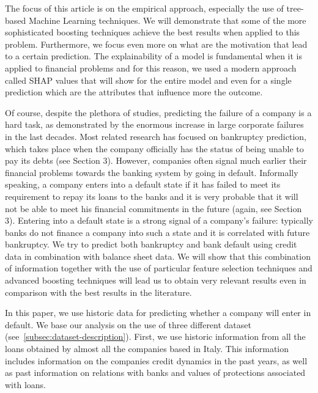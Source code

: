The focus of this article is on the empirical approach, especially the use of tree-based Machine Learning techniques. We will demonstrate that some of the more sophisticated boosting techniques achieve the best results when applied to this problem. Furthermore, we focus even more on what are the motivation that lead to a certain prediction. The explainability of a model is fundamental when it is applied to financial problems and for this reason, we used a modern approach called SHAP values that will show for the entire model and even for a single prediction which are the attributes that influence more the outcome. 

Of course, despite the plethora of studies, predicting the failure of a company is a hard task, as demonstrated by the enormous increase in large corporate failures in the last decades. Most related research has focused on bankruptcy prediction, which takes place when the company officially has the status of being unable to pay its debts (see Section 3). However, companies often signal much earlier their financial problems towards the banking system by going in default. Informally speaking, a company enters into a default state if it has failed to meet its requirement to repay its loans to the banks and it is very probable that it will not be able to meet his financial commitments in the future (again, see Section 3). Entering into a default state is a strong signal of a company’s failure: typically banks do not finance a company into such a state and it is correlated with future bankruptcy.
We try to predict both bankruptcy and bank default using credit data in combination with balance sheet data. We will show that this combination of information together with the use of particular feature selection techniques and advanced boosting techniques will lead us to obtain very relevant results even in comparison with the best results in the literature.

In this paper, we use historic data for predicting whether a company will enter in default. We base our analysis on the use of three different dataset (see~\ref{subsec:dataset-description}). First, we use historic information from all the loans obtained by almost all the companies based in Italy. This information includes information on the companies credit dynamics in the past years, as well as past information on relations with banks and values of protections associated with loans. 

